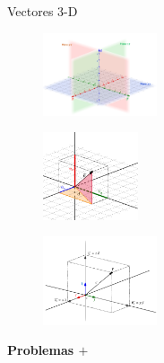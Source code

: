 \begin{myexampleblock}{Vectores 3-D}

\vspace{3mm} 

\begin{multicols}{3}
\begin{figure}[H]
	\centering
	\includegraphics[width=0.3\textwidth]{img-vec/vec21.png}	
\end{figure}

\begin{figure}[H]
	\centering
	\includegraphics[width=0.25\textwidth]{img-vec/vec22.png}	
\end{figure}

\begin{figure}[H]
	\centering
	\includegraphics[width=0.3\textwidth]{img-vec/vec23.png}	
\end{figure}	
\end{multicols}

\vspace{3mm}

\end{myexampleblock}





\newpage
\begin{adjustwidth}{50pt}{250pt}
\begin{cuadro-naranja}
\textbf{\huge{Problemas $\boldsymbol{+}$}}\normalsize{$\, $}
\end{cuadro-naranja}	
\end{adjustwidth}

